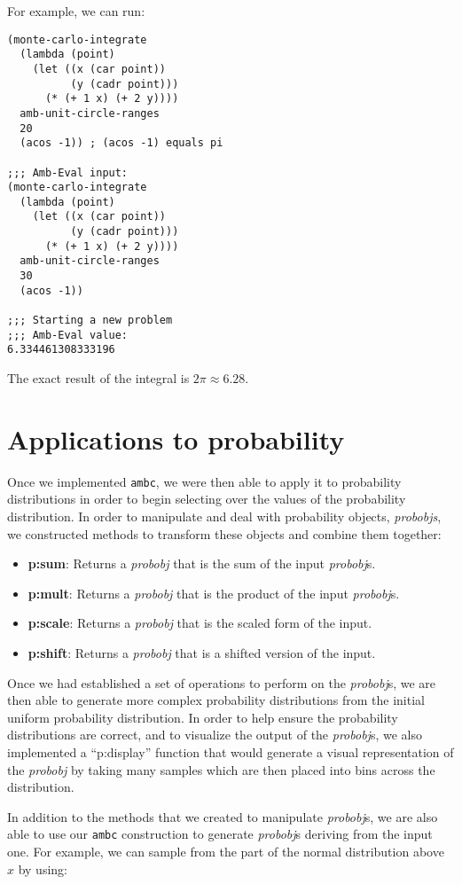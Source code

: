\documentclass{article}
\begin{document}
For example, we can run:
\begin{lstlisting}
(monte-carlo-integrate
  (lambda (point)
    (let ((x (car point))
          (y (cadr point)))
      (* (+ 1 x) (+ 2 y))))
  amb-unit-circle-ranges
  20
  (acos -1)) ; (acos -1) equals pi

;;; Amb-Eval input:
(monte-carlo-integrate
  (lambda (point)
    (let ((x (car point))
          (y (cadr point)))
      (* (+ 1 x) (+ 2 y))))
  amb-unit-circle-ranges
  30
  (acos -1))

;;; Starting a new problem
;;; Amb-Eval value:
6.334461308333196
\end{lstlisting}
The exact result of the integral is $2\pi \approx 6.28$.

\section{Applications to probability}
Once we implemented \texttt{ambc}, we were then able to apply it to probability
distributions in order to begin selecting over the values of the probability
distribution. In order to manipulate and deal with probability objects,
\textit{probobjs}, we constructed methods to transform these objects and combine
them together:

\begin{itemize}
  \item \textbf{p:sum}: Returns a \textit{probobj} that is the sum of the input
\textit{probobj}s.
  \item \textbf{p:mult}: Returns a \textit{probobj} that is the product of the
input \textit{probobj}s.
  \item \textbf{p:scale}: Returns a \textit{probobj} that is the scaled form of
the input.
  \item \textbf{p:shift}: Returns a \textit{probobj} that is a shifted version
of the input.
\end{itemize}

Once we had established a set of operations to perform on the
\textit{probobj}s, we are then able to generate more complex probability
distributions from the initial uniform probability distribution. In order to
help ensure the probability distributions are correct, and to visualize the
output of the \textit{probobj}s, we also implemented a ``p:display'' function
that would generate a visual representation of the \textit{probobj} by taking
many samples which are then placed into bins across the distribution.

In addition to the methods that we created to manipulate \textit{probobj}s, we
are also able to use our \texttt{ambc} construction to generate
\textit{probobj}s deriving from the input one. For example, we can sample from
the part of the normal distribution above $x$ by using:
\end{document}
